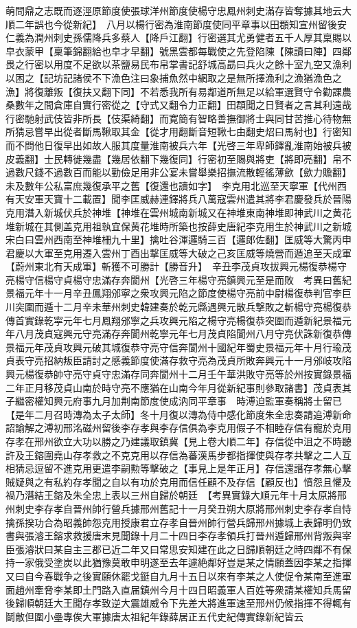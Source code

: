萌問鼎之志既而逐涇原節度使張球洋州節度使楊守忠鳳州刺史滿存皆奪據其地云大順二年誤也今從新紀】　八月以楊行密為淮南節度使同平章事以田頵知宣州留後安仁義為潤州刺史孫儒降兵多蔡人【降戶江翻】行密選其尤勇健者五千人厚其稟賜以皁衣蒙甲【稟筆錦翻給也皁才早翻】號黑雲都每戰使之先登陷陳【陳讀曰陣】四鄰畏之行密以用度不足欲以茶鹽易民布帛掌書記舒城高勗曰兵火之餘十室九空又漁利以困之【記坊記諸侯不下漁色注曰象捕魚然中網取之是無所擇漁利之漁猶漁色之漁】將復離叛【復扶又翻下同】不若悉我所有易鄰道所無足以給軍選賢守令勸課農桑數年之間倉庫自實行密從之【守式又翻令力正翻】田頵聞之日賢者之言其利遠哉行密馳射武伎皆非所長【伎渠綺翻】而寛簡有智略善撫御將士與同甘苦推心待物無所猜忌嘗早出從者斷馬鞦取其金【從才用翻斷音短鞦七由翻史炤曰馬紂也】行密知而不問他日復早出如故人服其度量淮南被兵六年【光啓三年卑師鐸亂淮南始被兵被皮義翻】士民轉徙幾盡【幾居依翻下幾復同】行密初至賜與將吏【將即亮翻】帛不過數尺錢不過數百而能以勤儉足用非公宴未嘗舉樂招撫流散輕徭薄歛【歛力贍翻】未及數年公私富庶幾復承平之舊【復還也讀如字】　李克用北巡至天寧軍【代州西有天安軍天寶十二載置】聞李匡威赫連鐸將兵八萬寇雲州遣其將李君慶發兵於晉陽克用潛入新城伏兵於神堆【神堆在雲州城南新城又在神堆東南神堆即神武川之黄花堆新城在其側盖克用祖執宜保黄花堆時所築也按薛史唐紀李克用生於神武川之新城宋白曰雲州西南至神堆柵九十里】擒吐谷渾邏騎三百【邏郎佐翻】匡威等大驚丙申君慶以大軍至克用遷入雲州丁酉出撃匡威等大破之己亥匡威等燒營而遁追至天成軍【蔚州東北有天成軍】斬獲不可勝計【勝音升】　辛丑李茂貞攻拔興元楊復恭楊守亮楊守信楊守貞楊守忠滿存奔閬州【光啓三年楊守亮鎮興元至是而敗　考異曰舊紀景福元年十一月辛丑鳳翔邠寧之衆攻興元陷之節度使楊守亮前中尉楊復恭判官李巨川突圍而遁十二月辛未華州刺史韓建奏於乾元縣遇興元散兵撃敗之斬楊守亮楊復恭傳首實錄乾寜元年七月鳳翔邠寧之兵攻興元陷之楊守亮楊復恭突圍而遁新紀景福元年八月茂貞寇興元守亮滿存奔閬州乾寧元年七月茂貞陷閬州八月守亮伏誅新復恭傳景福元年茂貞攻興元破其城復恭守亮守信奔閬州十國紀年蜀史景福元年十月行瑜茂貞表守亮招納叛臣請討之感義節度使滿存救守亮為茂貞所敗奔興元十一月邠岐攻陷興元楊復恭帥守亮守貞守忠滿存同奔閬州十二月壬午華洪敗守亮等於州按實錄景福二年正月移茂貞山南於時守亮不應猶在山南今年月從新紀事則參取諸書】茂貞表其子繼密權知興元府事九月加荆南節度使成汭同平章事　時溥迫監軍奏稱將士留已【是年二月召時漙為太子太師】冬十月復以漙為侍中感化節度朱全忠奏請追溥新命詔諭解之溥初邢洺磁州留後李存孝與李存信俱為李克用假子不相睦存信有寵於克用存孝在邢州欲立大功以勝之乃建議取鎮冀【見上卷大順二年】存信從中沮之不時聽許及王鎔圍堯山存孝救之不克克用以存信為蕃漢馬步都指揮使與存孝共擊之二人互相猜忌逗留不進克用更遣李嗣勲等擊破之【事見上是年正月】存信還譖存孝無心擊賊疑與之有私約存孝聞之自以有功於克用而信任顧不及存信【顧反也】憤怨且懼及禍乃潛結王鎔及朱全忠上表以三州自歸於朝廷　【考異實錄大順元年十月太原將邢州刺史李存孝自晉州帥行營兵據邢州舊記十一月癸丑朔大原將邢州刺史李存孝自恃擒孫揆功合為昭義帥怨克用授康君立存孝自晉州帥行營兵歸邢州據城上表歸明仍致書與張濬王鎔求救援唐末見聞錄十月二十四日李存孝領兵打晉州遁歸邢州背叛與宰臣張濬狀曰某自主三郡已近二年又曰常思安知建在此之日歸順朝廷之時四鄰不有保持一家俄受塗炭以此猶豫莫敢申明遂至去年遽絶鄰好豈是某之情願蓋因李某之指揮又曰自今春戰争之後實願休罷戈鋌自九月十五日以來有李某之人使促令某南至進軍面趙州牽脅李某即土門路入直届鎮州今月十四日昭義軍人百姓等衆請某權知兵馬留後歸順朝廷大王聞存孝致逆大震雄威令下先差大將進軍速至邢州仍候指揮不得輒有鬬敵但圍小壘專俟大軍據唐太祖紀年錄薛居正五代史紀傳實錄新紀皆云